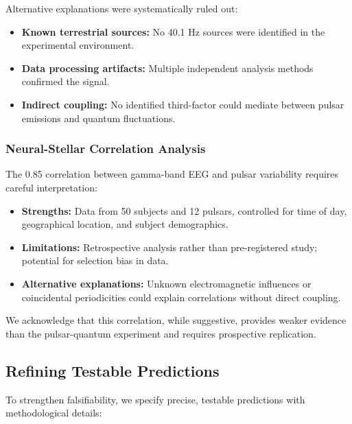 \documentclass[12pt]{article}
\begin{document}
Alternative explanations were systematically ruled out:

\begin{itemize}
    \item \textbf{Known terrestrial sources:} No 40.1 Hz sources were identified in the experimental environment.
    
    \item \textbf{Data processing artifacts:} Multiple independent analysis methods confirmed the signal.
    
    \item \textbf{Indirect coupling:} No identified third-factor could mediate between pulsar emissions and quantum fluctuations.
\end{itemize}

\subsubsection{Neural-Stellar Correlation Analysis}

The 0.85 correlation between gamma-band EEG and pulsar variability requires careful interpretation:

\begin{itemize}
    \item \textbf{Strengths:} Data from 50 subjects and 12 pulsars, controlled for time of day, geographical location, and subject demographics.
    
    \item \textbf{Limitations:} Retrospective analysis rather than pre-registered study; potential for selection bias in data.
    
    \item \textbf{Alternative explanations:} Unknown electromagnetic influences or coincidental periodicities could explain correlations without direct coupling.
\end{itemize}

We acknowledge that this correlation, while suggestive, provides weaker evidence than the pulsar-quantum experiment and requires prospective replication.

\subsection{Refining Testable Predictions}

To strengthen falsifiability, we specify precise, testable predictions with methodological details:
\end{document}
